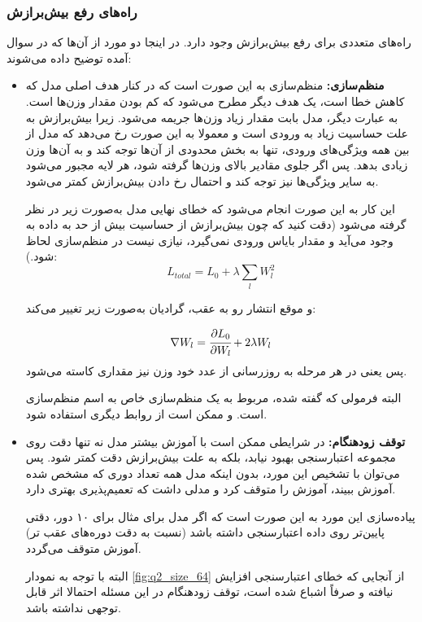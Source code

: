 \subsubsection{راه‌های رفع بیش‌برازش}
راه‌های متعددی برای رفع بیش‌برازش وجود دارد. در اینجا دو مورد از آن‌ها که در سوال آمده توضیح داده می‌شوند:
\begin{itemize}
	\item 
	\textbf{منظم‌سازی: }
	منظم‌سازی
	به این صورت است که در کنار هدف اصلی مدل که کاهش خطا است، یک هدف دیگر مطرح می‌شود که کم بودن مقدار وزن‌ها است. به عبارت دیگر، مدل بابت مقدار زیاد وزن‌ها جریمه می‌شود. زیرا بیش‌برازش به علت حساسیت زیاد به ورودی است و معمولا به این صورت رخ می‌دهد که مدل از بین همه ویژگی‌های ورودی، تنها به بخش محدودی از آن‌ها توجه کند و به آن‌ها وزن زیادی بدهد. پس اگر جلوی مقادیر بالای وزن‌ها گرفته شود، هر لایه مجبور می‌شود به سایر ویژگی‌ها نیز توجه کند و احتمال رخ دادن بیش‌برازش کمتر می‌شود. 
	
	این کار به این صورت انجام می‌شود که خطای نهایی مدل به‌صورت زیر در نظر گرفته می‌شود (دقت کنید که چون بیش‌برازش از حساسیت بیش از حد به داده به وجود می‌آید و مقدار بایاس ورودی نمی‌گیرد، نیازی نیست در منظم‌سازی لحاظ شود.):
	\begin{equation}
	L_{total} = L_0 + \lambda \sum_{l} W_l^2
		\end{equation}

		
	و موقع انتشار رو به عقب، گرادیان به‌صورت زیر تغییر می‌کند:
	
	\begin{equation}
	\nabla W_l = \cfrac{\partial L_0}{\partial W_l} + 2\lambda W_l
		\end{equation}
	پس یعنی در هر مرحله به روز‌رسانی از عدد خود وزن نیز مقداری کاسته می‌شود. 
	  
			البته فرمولی که گفته شده، مربوط به یک منظم‌سازی خاص به اسم منظم‌سازی 
	است. 
	و ممکن است از روابط دیگری استفاده شود.
	
	\item 
	\textbf{توقف زودهنگام: }
	در شرایطی ممکن است با آموزش بیشتر مدل نه تنها دقت روی مجموعه اعتبارسنجی بهبود نیابد، بلکه به علت بیش‌برازش دقت کمتر شود.
	پس می‌توان با تشخیص این مورد، بدون اینکه مدل همه تعداد دوری که مشخص شده آموزش ببیند، آموزش را متوقف کرد و مدلی داشت که  تعمیم‌پذیری بهتری دارد. 
	
	پیاده‌سازی این مورد به این صورت است که اگر مدل برای مثال برای ۱۰ دور، دقتی پایین‌تر روی داده اعتبارسنجی داشته باشد (نسبت به دقت دوره‌های عقب تر) آموزش متوقف می‌گردد.
	
	البته با توجه به نمودار 
	\ref{fig:q2_size_64}
	از آنجایی که خطای اعتبارسنجی افزایش نیافته و صرفاً اشباع شده است، توقف زودهنگام در این مسئله احتمالا اثر قابل توجهی نداشته باشد. 
\end{itemize}


